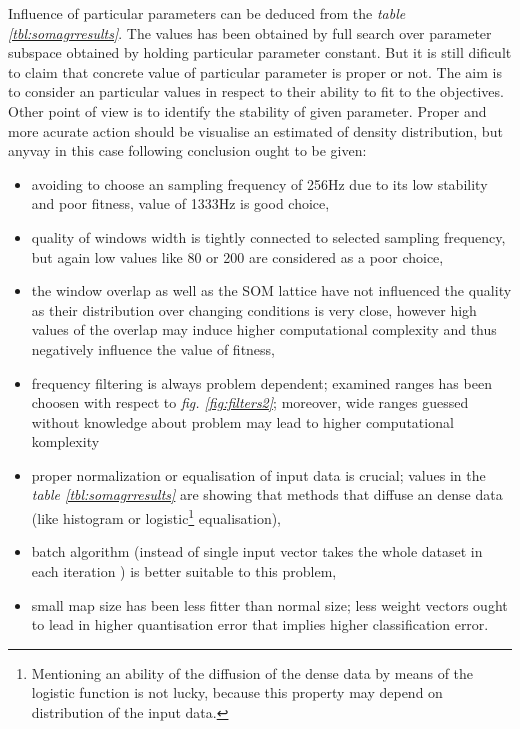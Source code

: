 \documentclass[a4paper]{IEEEtran}
\begin{document}
Influence of particular parameters can be deduced from the 
\textit{table \ref{tbl:somagrresults}}. The values has been obtained by full search over 
parameter subspace obtained by holding particular parameter constant.
But it is still dificult to claim that concrete value of particular parameter is proper 
or not. The aim is to consider an particular values in respect to their ability
to fit to the objectives. Other point of view is to identify the stability of given 
parameter. Proper and more acurate action should be visualise an estimated of density
distribution, but anyvay in this case following conclusion ought to be given:
\begin{itemize}
	\item avoiding to choose an sampling frequency of 256Hz due to its low stability and 
	poor fitness, value of 1333Hz is good choice,
	\item quality of windows width is tightly connected to selected sampling frequency,
	but again low values like 80 or 200 are considered as a poor choice,
	\item the window overlap as well as the SOM lattice have not influenced
	the quality as their distribution over changing conditions is very close, however high
	values of the overlap may induce higher computational complexity and thus negatively
	influence the value of fitness,
	\item frequency filtering is always problem dependent; examined ranges has been choosen
	with respect to \textit{fig. \ref{fig:filters2}}; moreover, wide ranges guessed
	without knowledge about problem may lead to higher computational komplexity
	\item proper normalization or equalisation of input data is crucial; values in the
	\textit{table \ref{tbl:somagrresults}} are showing that methods that diffuse an 
	dense data (like histogram or logistic\footnote{Mentioning an ability of the diffusion
	of the dense data
	by means of the logistic function is not lucky, because this property may depend on
	distribution of the input data.} equalisation),
	\item batch algorithm (instead of single input vector takes the whole dataset in each
	iteration \cite{somtoolbox}) is better suitable to this problem,
	\item small map size has been less fitter than normal size; less weight vectors 
	ought to lead in higher quantisation error that implies higher classification error.	
\end{itemize}
\end{document}
